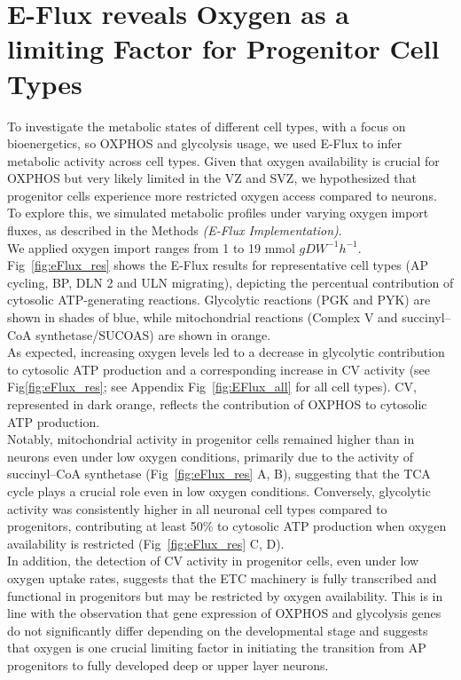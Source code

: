 \section{E-Flux reveals Oxygen as a limiting Factor for Progenitor Cell Types}
To investigate the metabolic states of different cell types, with a focus on bioenergetics, so OXPHOS and glycolysis usage, we used E-Flux to infer metabolic activity across cell types. Given that oxygen availability is crucial for OXPHOS but very likely limited in the VZ and SVZ, we hypothesized that progenitor cells experience more restricted oxygen access
compared to neurons. To explore this, we simulated metabolic profiles under varying oxygen import fluxes, as described in the Methods \textit{(E-Flux Implementation)}.
\\

We applied oxygen import ranges from 1 to 19 mmol $gDW^{-1} h^{-1}$. 
Fig~\ref{fig:eFlux_res} shows the E-Flux results for representative cell types (AP cycling, BP, DLN 2 and ULN migrating), depicting the percentual contribution of cytosolic ATP-generating reactions. Glycolytic reactions (PGK and PYK) are shown in shades of blue, while mitochondrial reactions (Complex V and succinyl–CoA synthetase/SUCOAS)  are shown in orange. 
\\

As expected, increasing oxygen levels led to a decrease in glycolytic contribution to cytosolic ATP production and a corresponding increase in CV activity
(see Fig\ref{fig:eFlux_res}; see Appendix Fig~\ref{fig:EFlux_all} for all cell types). CV, represented in dark orange, reflects the contribution of OXPHOS to cytosolic ATP production.
\\

Notably, mitochondrial activity in progenitor cells remained higher than in neurons even under low oxygen conditions, primarily due to the activity of succinyl–CoA synthetase
(Fig~\ref{fig:eFlux_res} A, B), suggesting that the TCA cycle plays a crucial role even in low oxygen conditions. Conversely, glycolytic activity was consistently higher in all neuronal cell types compared to progenitors, contributing at least 50\% to cytosolic ATP production when oxygen availability is restricted
(Fig~\ref{fig:eFlux_res} C, D).
\\

In addition, the detection of  CV activity in progenitor cells, even under low oxygen uptake rates, suggests that the ETC machinery is fully transcribed and functional in progenitors but may be restricted by oxygen availability. This is in line with the observation that gene expression of OXPHOS and glycolysis genes do not significantly differ depending on the developmental stage and suggests that oxygen is one crucial limiting factor in initiating the transition from AP progenitors to fully developed deep or upper layer neurons.



